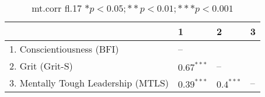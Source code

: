 \begin{table}[ht]
\centering
\begin{tabular}{llll}
  \hline
 & 1 & 2 & 3 \\ 
  \hline
1. Conscientiousness (BFI) & -- &  &  \\ 
  2. Grit (Grit-S) & $0.67^{***}$ & -- &  \\ 
  3. Mentally Tough Leadership (MTLS) & $0.39^{***}$ & $0.4^{***}$ & -- \\ 
   \hline
\end{tabular}
\caption{mt.corr fl.17 $* p < 0.05; ** p < 0.01; *** p < 0.001$} 
\label{freq_corr.mt.corr.fl.17}
\end{table}
